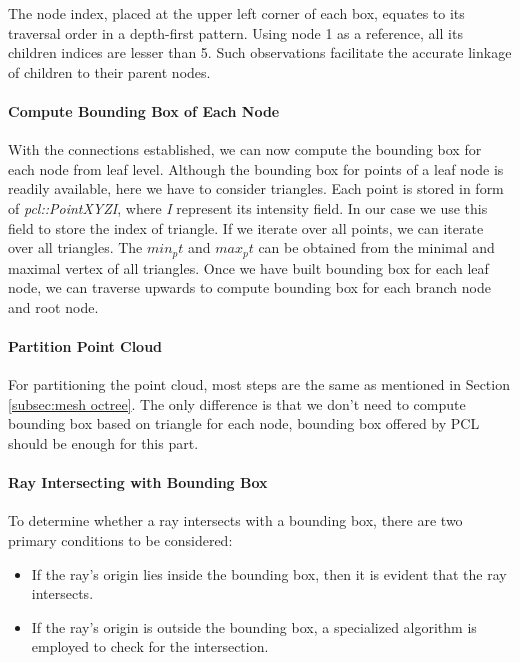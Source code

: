 \documentclass[11pt, a4paper,oneside,chapterprefix=false]{scrbook}
\begin{document}
The node index, placed at the upper left corner of each box, equates to its traversal order in a depth-first pattern. Using node 1 as a reference, all its children indices are lesser than 5. Such observations facilitate the accurate linkage of children to their parent nodes.

\paragraph{Compute Bounding Box of Each Node}

With the connections established, we can now compute the bounding box for each node from leaf level. Although the bounding box for points of a leaf node is readily available, here we have to consider triangles. Each point is stored in form of \emph{pcl::PointXYZI}, where \emph{I} represent its intensity field. In our case we use this field to store the index of triangle. If we iterate over all points, we can iterate over all triangles. The $min_pt$ and $max_pt$ can be obtained from the minimal and maximal vertex of all triangles. Once we have built bounding box for each leaf node, we can traverse upwards to compute bounding box for each branch node and root node. 

\paragraph{Partition Point Cloud}

For partitioning the point cloud, most steps are the same as mentioned in Section \ref{subsec:mesh octree}. The only difference is that we don't need to compute bounding box based on triangle for each node, bounding box offered by PCL should be enough for this part.

\paragraph{Ray Intersecting with Bounding Box}

To determine whether a ray intersects with a bounding box, there are two primary conditions to be considered:

\begin{itemize}
    \item If the ray's origin lies inside the bounding box, then it is evident that the ray intersects.
    \item If the ray's origin is outside the bounding box, a specialized algorithm is employed to check for the intersection.
\end{itemize}
\end{document}

